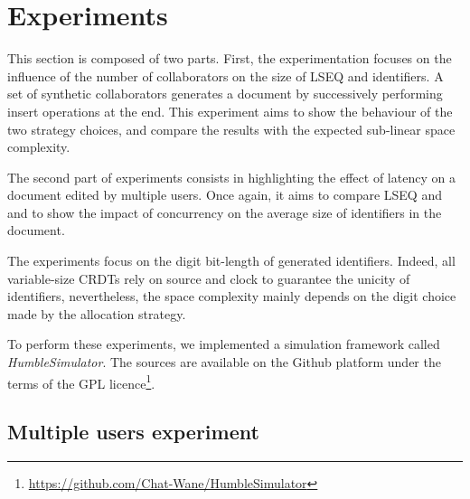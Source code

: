 
\section{Experiments}
\label{sec:experiments}

This section is composed of two parts. First, the experimentation focuses on
the influence of the number of collaborators on the size of LSEQ and \NAME{}
identifiers.  A set of synthetic collaborators generates a document by
successively performing insert operations at the end. This experiment aims to
show the behaviour of the two strategy choices, and compare the results with
the expected sub-linear space complexity.

The second part of experiments consists in highlighting the effect of latency
on a document edited by multiple users. Once again, it aims to compare LSEQ and
\NAME{} and to show the impact of concurrency on the average size of
identifiers in the document.

The experiments focus on the digit bit-length of generated identifiers.
Indeed, all variable-size CRDTs rely on source and clock to guarantee the
unicity of identifiers, nevertheless, the space complexity mainly depends on
the digit choice made by the allocation strategy.

To perform these experiments, we implemented a simulation framework called
\emph{HumbleSimulator}. The sources are available on the Github platform under
the terms of the GPL
licence\footnote{\url{https://github.com/Chat-Wane/HumbleSimulator}}.

\subsection{Multiple users experiment}

